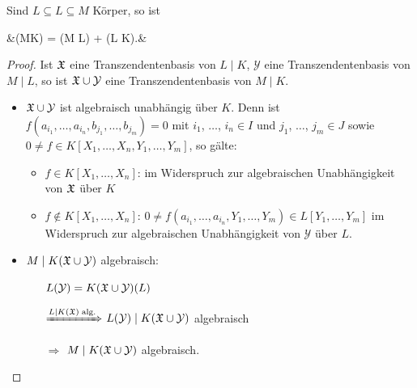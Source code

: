 \begin{conclusion}
	Sind $L \subseteq L \subseteq M$ Körper, so ist
	\begin{flalign*}
		\qquad&\transdeg(M\mid K) = \transdeg(M \mid L) + \transdeg(L \mid K).&
	\end{flalign*}
\end{conclusion}
\vspace*{-3pt}
\begin{proof}
	Ist $\mathfrak{X}$ eine Transzendentenbasis von $L\mid K$, $\mathcal Y$ eine Transzendentenbasis von $M\mid L$, so ist $\mathfrak{X}\cup\mathcal Y$ eine Transzendentenbasis von $M\mid K$.
	
	\begin{itemize}[topsep=-7pt,parsep=\lineskip,itemsep=\lineskip]
		\item $\mathfrak{X}\cup\mathcal Y$ ist algebraisch unabhängig über $K$. Denn ist $f(a_{i_1},\dots,a_{i_n},b_{j_1},\dots,b_{j_m}) = 0$ mit $i_1$, $\dots$, $i_n\in I$ und $j_1$, $\dots$, $j_m\in J$ sowie $0\neq f\in K[X_1,\dots,X_n,Y_1,\dots,Y_m]$, so gälte:
		\begin{itemize}[topsep=-3pt]
			\item $f\in K[X_1,\dots,X_n]$: im Widerspruch zur algebraischen Unabhängigkeit von $\mathfrak{X}$ über $K$
			\item $f\notin K[X_1,\dots,X_n]$: $0\neq f(a_{i_1},\dots,a_{i_n}, Y_1,\dots,Y_{m})\in L[Y_1,\dots,Y_m]$ im Widerspruch zur algebraischen Unabhängigkeit von $\mathcal Y$ über $L$.
		\end{itemize}
		\vspace*{-1pt}
		\item $M\mid K(\mathfrak{X}\cup\mathcal Y)$ algebraisch:
		\begin{itemize}[topsep=-5pt,left=5em,parsep=\lineskip,itemsep=\lineskip]
			\item[] $L(\mathcal Y) = K(\mathfrak{X}\cup \mathcal Y)(L)$
			\item[$\xRightarrow{L\mid K(\mathfrak{X})\;\text{alg.}}$] $L(\mathcal Y)\mid K(\mathfrak{X}\cup \mathcal Y)$ algebraisch
			\item[$\Rightarrow$] $M\mid K(\mathfrak{X}\cup\mathcal Y)$ algebraisch.
		\end{itemize}
	\end{itemize}
\end{proof}